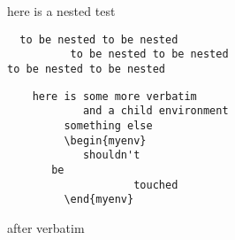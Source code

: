 here is a nested test
\begin{verbatim}
  to be nested to be nested
          to be nested to be nested
to be nested to be nested 
\end{verbatim}
\begin{lstlisting}
    here is some more verbatim
            and a child environment
         something else
         \begin{myenv}
            shouldn't
       be
                    touched
         \end{myenv}
\end{lstlisting}
after verbatim
